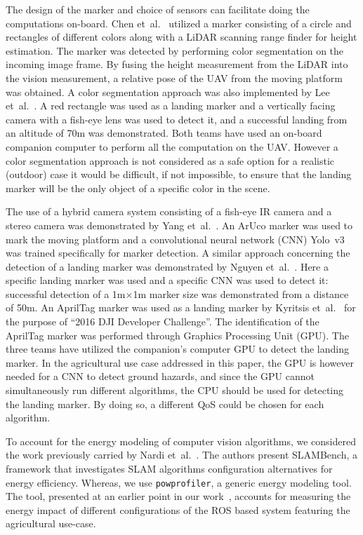 \documentclass[conference]{IEEEtran}
\newcommand{\stt}[1]{{\small\tt #1}} %
\newcommand{\powprof}{\stt{powprofiler}}
\begin{document}
The design of the marker and choice of sensors can facilitate doing the computations on-board. %
%
Chen et~al.~\cite{chen2016system} utilized a marker consisting of a circle and rectangles of different colors along with a LiDAR scanning range finder for height estimation. The marker was detected by performing color segmentation on the incoming image frame. By fusing the height measurement from the LiDAR into the vision measurement, a relative pose of the UAV from the moving platform was obtained. A color segmentation approach was also implemented by Lee et~al.~\cite{lee2016vision}. A red rectangle was used as a landing marker and a vertically facing camera with a fish-eye lens was used to detect it, and a successful landing from an altitude of 70m was demonstrated. Both teams have used an on-board companion computer to perform all the computation on the UAV. However a color segmentation approach is not considered as a safe option for a realistic (outdoor) case it would be difficult, if not impossible, to ensure that the landing marker will be the only object of a specific color in the scene.

The use of a hybrid camera system consisting of a fish-eye IR camera and a stereo camera was demonstrated by Yang et~al.~\cite{yang2018hybrid}. An ArUco marker was used to mark the moving platform and a convolutional neural network (CNN) Yolo~v3 was trained specifically for marker detection. A similar approach concerning the detection of a landing marker was demonstrated by Nguyen et~al.~\cite{nguyen2018lightdenseyolo}. Here a specific landing marker was used and a specific CNN was used to detect it: successful detection of a 1m$\times$1m marker size was demonstrated from a distance of 50m. An AprilTag marker was used as a landing marker by Kyritsis et~al.~\cite{kyristsis2016towards} for the purpose of ``2016 DJI Developer Challenge''. The identification of the AprilTag marker was performed through Graphics Processing Unit (GPU). The three teams have utilized the companion's computer GPU to detect the landing marker. In the agricultural use case addressed in this paper, the GPU is however needed for a CNN to detect ground hazards, and since the GPU cannot simultaneously run different algorithms, %
the CPU should be used for detecting the landing marker. By doing so, a different QoS could be chosen for each algorithm.    

To account for the energy modeling of computer vision algorithms, we considered the work previously carried by Nardi et~al.~\cite{nardi2015introducing}. The authors present SLAMBench, a framework that investigates SLAM algorithms configuration alternatives for energy efficiency. Whereas, we use \powprof{}, a generic energy modeling tool. The tool, presented at an earlier point in our work~\cite{seewald2019coarse}, accounts for measuring the energy impact of different configurations of the ROS based system featuring the agricultural use-case.
\end{document}
